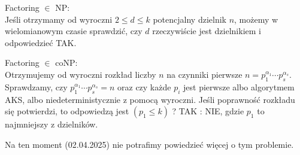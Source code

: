 Factoring \( \in \) NP: \\
Jeśli otrzymamy od wyroczni \( 2 \leq d \leq k \) potencjalny dzielnik \( n \), możemy w wielomianowym czasie sprawdzić, czy \( d \) rzeczywiście jest dzielnikiem i odpowiedzieć TAK.

Factoring \( \in \) coNP: \\
Otrzymujemy od wyroczni rozkład liczby \( n \) na czynniki pierwsze \( n = p_1^{\alpha_1} \cdots p_s^{\alpha_s} \). Sprawdzamy, czy \( p_1^{\alpha_1} \cdots p_s^{\alpha_s} = n \) oraz czy każde \( p_i \) jest pierwsze albo algorytmem AKS, albo niedeterministycznie z pomocą wyroczni. Jeśli poprawność rozkładu się potwierdzi, to odpowiedzą jest \( (p_1 \leq k) \) ? TAK : NIE, gdzie \( p_1 \) to najmniejszy z dzielników.

Na ten moment (02.04.2025) nie potrafimy powiedzieć więcej o tym problemie.